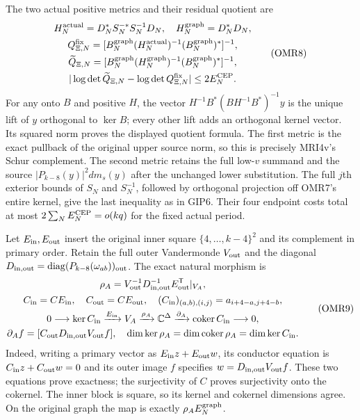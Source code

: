\documentclass[11pt,a4paper]{article}
\begin{document}
The two actual positive metrics and their residual quotient are
\[
 \begin{gathered}
 H_N^{\rm actual}=D_N^*S_N^{-*}S_N^{-1}D_N,\quad
 H_N^{\rm graph}=D_N^*D_N,\\
 Q_{\Xi,N}^{\rm fix}
   =[B_N^{\rm graph}(H_N^{\rm actual})^{-1}
                              (B_N^{\rm graph})^*]^{-1},\\
 \widetilde Q_{\Xi,N}
   =[B_N^{\rm graph}(H_N^{\rm graph})^{-1}
                              (B_N^{\rm graph})^*]^{-1},\\
 |\log\det\widetilde Q_{\Xi,N}-\log\det Q_{\Xi,N}^{\rm fix}|
                           \le2E_N^{\rm CEP}.
 \end{gathered}\tag{OMR8}
\]
For any onto $B$ and positive $H$, the vector
$H^{-1}B^*(BH^{-1}B^*)^{-1}y$ is the unique lift of $y$
orthogonal to $\ker B$; every other lift adds an orthogonal
kernel vector. Its squared norm proves the displayed quotient
formula. The first metric is the exact pullback of the original
upper source norm, so this is precisely MRI4v's Schur complement.
The second metric retains the full low-$v$ summand and the source
$|P_{k-8}(y)|^2dm_s(y)$ after the unchanged lower substitution.
The full $j$th exterior bounds of $S_N$ and $S_N^{-1}$, followed
by orthogonal projection off OMR7's entire kernel, give the last
inequality as in GIP6. Their four endpoint costs total at most
$2\sum_NE_N^{\rm CEP}=o(kq)$ for the fixed actual period.

Let $E_{\rm in},E_{\rm out}$ insert the original inner square
$\{4,\ldots,k-4\}^2$ and its complement in primary order.
Retain the full outer Vandermonde $V_{\rm out}$ and the diagonal
$D_{\rm in,out}=\operatorname{diag}
(P_{k-8}(\omega_{ab}))_{\rm out}$. The exact natural morphism is
\[
 \begin{gathered}
 \rho_A=V_{\rm out}^{-1}D_{\rm in,out}^{-1}
                         E_{\rm out}^{\mathsf T}|_{V_A},\\
 C_{\rm in}=CE_{\rm in},\quad C_{\rm out}=CE_{\rm out},\quad
 (C_{\rm in})_{(a,b),(i,j)}=a_{i+4-a,j+4-b},\\
 0\longrightarrow\ker C_{\rm in}
   \xrightarrow{E_{\rm in}}V_A
   \xrightarrow{\rho_A}\mathbb C^\Delta
   \xrightarrow{\partial_A}\operatorname{coker}C_{\rm in}
   \longrightarrow0,\\
 \partial_A f=[C_{\rm out}D_{\rm in,out}V_{\rm out}f],\quad
 \dim\ker\rho_A=\dim\operatorname{coker}\rho_A
                              =\dim\ker C_{\rm in}.
 \end{gathered}\tag{OMR9}
\]
Indeed, writing a primary vector as $E_{\rm in}z+E_{\rm out}w$,
its conductor equation is $C_{\rm in}z+C_{\rm out}w=0$ and its
outer image $f$ specifies $w=D_{\rm in,out}V_{\rm out}f$.
These two equations prove exactness; the surjectivity of $C$
proves surjectivity onto the cokernel. The inner block is square,
so its kernel and cokernel dimensions agree. On the original
graph the map is exactly $\rho_AE_N^{\rm graph}$.
\end{document}
